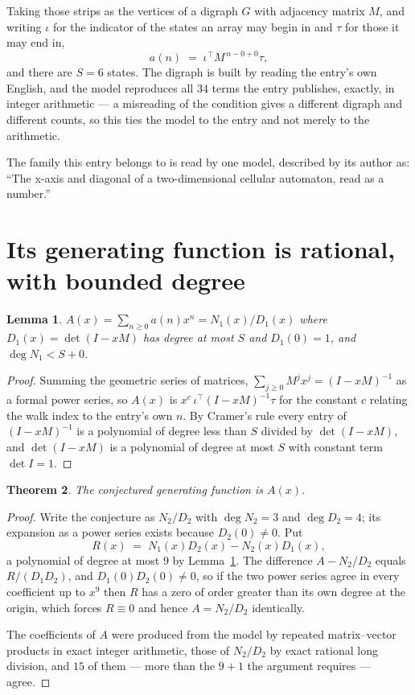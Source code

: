 \documentclass[11pt,a4paper]{article}
\theoremstyle{plain}
\newtheorem{theorem}{Theorem}
\newtheorem{lemma}[theorem]{Lemma}
\theoremstyle{definition}
\begin{document}
Taking those strips as the vertices of a digraph $G$ with adjacency matrix $M$, and writing
$\iota$ for the indicator of the states an array may begin in and $\tau$ for those it may end
in,
\[
a(n)\;=\;\iota^{\!\top}M^{\,n-0+0}\tau ,
\]
and there are $S=6$ states. The digraph is built by reading the entry's own English, and the
model reproduces all $34$ terms the entry publishes, exactly, in integer arithmetic --- a
misreading of the condition gives a different digraph and different counts, so this ties the
model to the entry and not merely to the arithmetic.

The family this entry belongs to is read by one model, described by its author as: ``The x-axis and diagonal of a two-dimensional cellular automaton, read as a number.''


\section{Its generating function is rational, with bounded degree}

\begin{lemma}\label{lem:rat}
$A(x)=\sum_{n\ge0}a(n)x^n=N_1(x)/D_1(x)$ where $D_1(x)=\det(I-xM)$ has degree at most
$S$ and $D_1(0)=1$, and $\deg N_1<S+0$.
\end{lemma}

\begin{proof}
Summing the geometric series of matrices, $\sum_{j\ge0}M^jx^j=(I-xM)^{-1}$ as a formal
power series, so $A(x)$ is $x^{c}\,\iota^{\!\top}(I-xM)^{-1}\tau$ for the constant $c$
relating the walk index to the entry's own $n$. By Cramer's rule every entry of
$(I-xM)^{-1}$ is a polynomial of degree less than $S$ divided by $\det(I-xM)$, and
$\det(I-xM)$ is a polynomial of degree at most $S$ with constant term $\det I=1$.
\end{proof}

\begin{theorem}
The conjectured generating function is $A(x)$.
\end{theorem}

\begin{proof}
Write the conjecture as $N_2/D_2$ with $\deg N_2=3$ and $\deg D_2=4$; its expansion as a
power series exists because $D_2(0)\neq0$. Put
\[
R(x)\;=\;N_1(x)D_2(x)-N_2(x)D_1(x),
\]
a polynomial of degree at most $9$ by Lemma~\ref{lem:rat}. The difference
$A-N_2/D_2$ equals $R/(D_1D_2)$, and $D_1(0)D_2(0)\neq0$, so if the two power series agree in
every coefficient up to $x^{9}$ then $R$ has a zero of order greater than its own
degree at the origin, which forces $R\equiv0$ and hence $A=N_2/D_2$ identically.

The coefficients of $A$ were produced from the model by repeated matrix--vector products in
exact integer arithmetic, those of $N_2/D_2$ by exact rational long division, and $15$
of them --- more than the $9+1$ the argument requires --- agree.
\end{proof}
\end{document}
